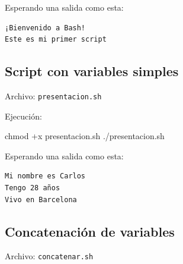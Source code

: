 \documentclass[
  spanish,
  12pt,
  letterpaper,
  DIV=11,
  numbers=noendperiod]{scrreprt}
\newenvironment{Shaded}{\begin{snugshade}}{\end{snugshade}}
\newcommand{\BuiltInTok}[1]{\textcolor[rgb]{0.00,0.23,0.31}{#1}}
\newcommand{\CommentTok}[1]{\textcolor[rgb]{0.37,0.37,0.37}{#1}}
\newcommand{\ExtensionTok}[1]{\textcolor[rgb]{0.00,0.23,0.31}{#1}}
\newcommand{\FunctionTok}[1]{\textcolor[rgb]{0.28,0.35,0.67}{#1}}
\newcommand{\NormalTok}[1]{\textcolor[rgb]{0.00,0.23,0.31}{#1}}
\newcommand{\OperatorTok}[1]{\textcolor[rgb]{0.37,0.37,0.37}{#1}}
\newcommand{\StringTok}[1]{\textcolor[rgb]{0.13,0.47,0.30}{#1}}
\newcommand{\VariableTok}[1]{\textcolor[rgb]{0.07,0.07,0.07}{#1}}
\begin{document}
Esperando una salida como esta:

\begin{verbatim}
¡Bienvenido a Bash!
Este es mi primer script
\end{verbatim}

\subsection{Script con variables
simples}\label{script-con-variables-simples}

Archivo: \texttt{presentacion.sh}

\begin{Shaded}
\end{Shaded}

Ejecución:

\begin{Shaded}
\begin{Highlighting}[]
\FunctionTok{chmod}\NormalTok{ +x presentacion.sh}
\ExtensionTok{./presentacion.sh}
\end{Highlighting}
\end{Shaded}

Esperando una salida como esta:

\begin{verbatim}
Mi nombre es Carlos
Tengo 28 años
Vivo en Barcelona
\end{verbatim}

\subsection{Concatenación de
variables}\label{concatenaciuxf3n-de-variables}

Archivo: \texttt{concatenar.sh}

\begin{Shaded}
\end{Shaded}
\end{document}
